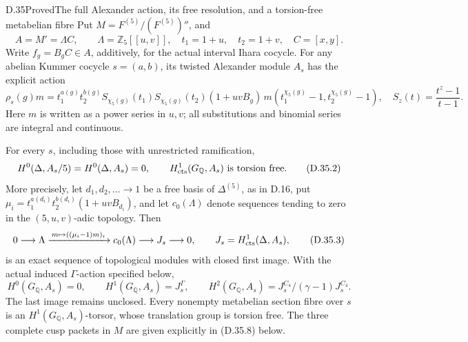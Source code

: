 \begin{statement}{D.35}{Proved}{The full Alexander action, its free resolution, and a torsion-free metabelian fibre}
Put \(M=F^{(5)}/(F^{(5)})''\), and
\[
 A=M'=\Lambda C,\qquad
 \Lambda=\mathbb Z_5[[u,v]],\quad
 t_1=1+u,\quad t_2=1+v,\quad C=[x,y].
\]
Write \(f_g=B_gC\in A\), additively, for the
actual interval Ihara cocycle. For any abelian
Kummer cocycle \(s=(a,b)\), its twisted
Alexander module \(A_s\) has the explicit action
\[
 \rho_s(g)m=
 t_1^{a(g)}t_2^{b(g)}
 S_{\chi_5(g)}(t_1)S_{\chi_5(g)}(t_2)
       (1+uvB_g)\,
 m(t_1^{\chi_5(g)}-1,t_2^{\chi_5(g)}-1),
 \quad S_z(t)=\frac{t^z-1}{t-1}.               \tag{D.35.1}
\]
Here \(m\) is written as a power series in
\(u,v\); all substitutions and binomial series
are integral and continuous.

For every \(s\), including those with
unrestricted ramification,
\[
 H^0(\Delta,A_s/5)=H^0(\Delta,A_s)=0,
 \qquad H^1_{\rm cts}(G_{\mathbb Q},A_s)
                    \text{ is torsion free}.              \tag{D.35.2}
\]
More precisely, let \(d_1,d_2,\ldots\to1\)
be a free basis of \(\Delta^{(5)}\), as in
D.16, put
\(\mu_i=t_1^{a(d_i)}t_2^{b(d_i)}(1+uvB_{d_i})\),
and let \(c_0(\Lambda)\) denote sequences
tending to zero in the \((5,u,v)\)-adic
topology. Then
\[
 0\longrightarrow\Lambda
   \xrightarrow{\,m\mapsto((\mu_i-1)m)_i\,}
   c_0(\Lambda)\longrightarrow J_s
   \longrightarrow0,\qquad
 J_s=H^1_{\rm cts}(\Delta,A_s),                 \tag{D.35.3}
\]
is an exact sequence of topological modules
with closed first image. With the actual
induced \(\Gamma\)-action specified below,
\[
 H^0(G_{\mathbb Q},A_s)=0,\qquad
 H^1(G_{\mathbb Q},A_s)=J_s^\Gamma,\qquad
 H^2(G_{\mathbb Q},A_s)=
       J_s^{C_4}/(\gamma-1)J_s^{C_4}.           \tag{D.35.4}
\]
The last image remains unclosed. Every
nonempty metabelian section fibre over \(s\)
is an \(H^1(G_{\mathbb Q},A_s)\)-torsor,
whose translation group is torsion free.
The three complete cusp packets in \(M\)
are given explicitly in (D.35.8) below.
\end{statement}
